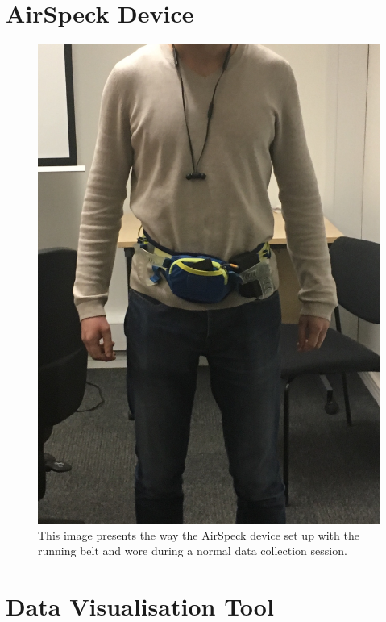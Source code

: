 \documentclass[bsc,frontabs,twoside,singlespacing, parskip,deptreport]{infthesis}     %
\begin{document}
\begin{appendices}

\chapter{AirSpeck Device}

\begin{figure}[h!]
  \center
  \includegraphics[width=0.6\columnwidth]{airspeck_on_me.jpg}
  \caption{This image presents the way the AirSpeck device set up with the running belt and wore during a normal data collection session.}
  \label{fig:airspeck_on_me}
\end{figure}

\chapter{Data Visualisation Tool}



\end{appendices}
\end{document}
